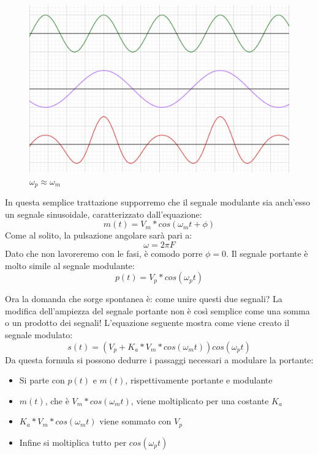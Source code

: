 \documentclass[11pt,a4paper]{article}
\begin{document}
\begin{figure}
  \includegraphics[width=\linewidth]{images/wrong_mod.png}
  \caption{$\omega_p  \approx \omega_m$}
  \label{fig:w_mod}
\end{figure}

In questa semplice trattazione supporremo che il segnale modulante sia anch'esso un segnale sinusoidale, caratterizzato dall'equazione:
$$
m(t) = V_m * cos(\omega_m t + \phi)
$$
Come al solito, la pulsazione angolare sarà pari a:
$$
\omega = 2 \pi F
$$
Dato che non lavoreremo con le fasi, è comodo porre $\phi = 0$. Il segnale portante è molto simile al segnale modulante:
$$
p(t) = V_p * cos(\omega_p t)
$$

Ora la domanda che sorge spontanea è: come unire questi due segnali? La modifica dell'ampiezza del segnale portante non è così semplice come una somma o un prodotto dei segnali! L'equazione seguente mostra come viene creato il segnale modulato:
$$
s(t) = (V_p + K_a * V_m * cos(\omega_m t) ) cos(\omega_p t)
$$
Da questa formula si possono dedurre i passaggi necessari a modulare la portante:
\begin{itemize}
\item Si parte con $p(t)$ e $m(t)$, rispettivamente portante e modulante
\item $m(t)$, che è $V_m * cos(\omega_m t)$, viene moltiplicato per una costante $K_a$
\item $K_a * V_m * cos(\omega_m t)$ viene sommato con $V_p$
\item Infine si moltiplica tutto per $cos(\omega_p t)$
\end{itemize}
\end{document}

